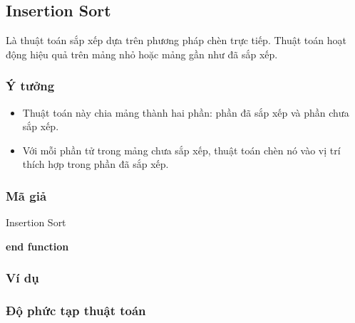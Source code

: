 \subsection{Insertion Sort}

Là thuật toán sắp xếp dựa trên phương pháp chèn trực tiếp. Thuật toán 
hoạt động hiệu quả trên mảng nhỏ hoặc mảng gần như đã sắp xếp.

\subsubsection{Ý tưởng}

\begin{itemize}
    \item Thuật toán này chia mảng thành hai phần: phần đã sắp xếp và 
    phần chưa sắp xếp.
    \item Với mỗi phần tử trong mảng chưa sắp xếp, thuật toán chèn nó 
    vào vị trí thích hợp trong phần đã sắp xếp. 
\end{itemize}

\subsubsection{Mã giả}

\begin{algorithm}[H]
\caption{Insertion Sort}
\textbf{end function}
\end{algorithm}

\subsubsection{Ví dụ}

\subsubsection{Độ phức tạp thuật toán}

